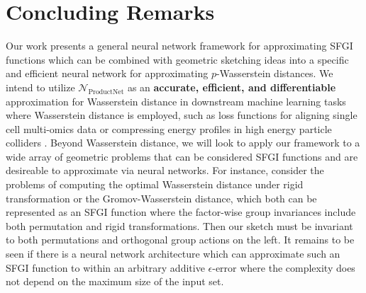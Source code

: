\documentclass[12pt]{article}
\newcommand{\R}{\mathbb R}
\newcommand{\Network}{\mathcal{N}_{\mathrm{ProductNet}}}
\newcommand{\SFGI} {{SFGI}}
\begin{document}
\section{Concluding Remarks}
Our work presents a general neural network framework for approximating \SFGI{} functions which can be combined with geometric sketching ideas into a specific and efficient neural network for approximating $p$-Wasserstein distances. 
We intend to utilize $\Network$ as an {\bf accurate, efficient, and differentiable} approximation for Wasserstein distance in downstream machine learning tasks where Wasserstein distance is employed, such as loss functions for aligning single cell multi-omics data \citep{demetci2020gromov} or compressing energy profiles in high energy particle colliders \citep{di2021reconfigurable, shenoyemd}. 
Beyond Wasserstein distance, we will look to apply our framework to a wide array of geometric problems that can be considered \SFGI{} functions and are desireable to approximate via neural networks.
For instance, consider the problems of computing the optimal Wasserstein distance under rigid transformation or the Gromov-Wasserstein distance, which both can be represented as an \SFGI{} function where the factor-wise group invariances include both permutation and rigid transformations. 
Then our sketch must be invariant to both permutations and orthogonal group actions on the left.
It remains to be seen if there is a neural network architecture which can approximate such an \SFGI{} function to within an arbitrary additive $\epsilon$-error where the complexity does not depend on the maximum size of the input set.
\end{document}
